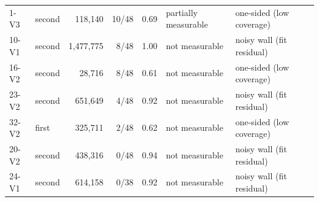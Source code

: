 \begin{tabular}{llrrclll}
1-V3 & second & 118,140 & 10/48 & 0.69 & partially measurable & one-sided (low coverage) &  \\
10-V1 & second & 1,477,775 & 8/48 & 1.00 & not measurable & noisy wall (fit residual) &  \\
16-V2 & second & 28,716 & 8/48 & 0.61 & not measurable & one-sided (low coverage) &  \\
23-V2 & second & 651,649 & 4/48 & 0.92 & not measurable & noisy wall (fit residual) &  \\
32-V2 & first & 325,711 & 2/48 & 0.62 & not measurable & one-sided (low coverage) &  \\
20-V2 & second & 438,316 & 0/48 & 0.94 & not measurable & noisy wall (fit residual) &  \\
24-V1 & second & 614,158 & 0/38 & 0.92 & not measurable & noisy wall (fit residual) &  \\
\bottomrule
\end{tabular}
